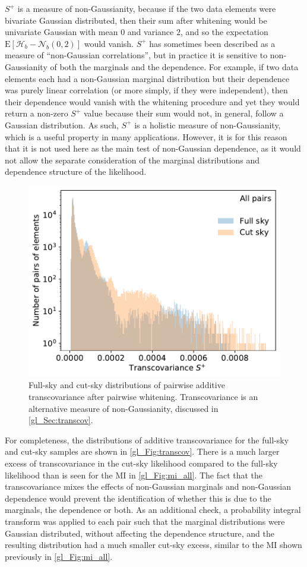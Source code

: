 $S^+$ is a measure of non-Gaussianity, because if the two data elements were bivariate Gaussian distributed, then their sum after whitening would be univariate Gaussian with mean $0$ and variance $2$, and so the expectation $\text{E} \left[ \mathcal{H}_b - \mathcal{N}_b \left(0, 2 \right) \right]$ would vanish. $S^+$ has sometimes been described as a measure of ``non-Gaussian correlations'', but in practice it is sensitive to non-Gaussianity of both the marginals and the dependence.
For example, if two data elements each had a non-Gaussian marginal distribution but their dependence was purely linear correlation (or more simply, if they were independent), then their dependence would vanish with the whitening procedure and yet they would return a non-zero $S^+$ value because their sum would not, in general, follow a Gaussian distribution. As such, $S^+$ is a holistic measure of non-Gaussianity, which is a useful property in many applications. However, it is for this reason that it is not used here as the main test of non-Gaussian dependence, as it would not allow the separate consideration of the marginal distributions and dependence structure of the likelihood.

\begin{figure}
\centering
\includegraphics[width=.5\textwidth]{transcov}
\caption{Full-sky and cut-sky distributions of pairwise additive transcovariance after pairwise whitening. Transcovariance is an alternative measure of non-Gaussianity, discussed in \autoref{gl_Sec:transcov}.}
\label{gl_Fig:transcov}
\end{figure}

For completeness, the distributions of additive transcovariance for the full-sky and cut-sky samples are shown in \autoref{gl_Fig:transcov}. There is a much larger excess of transcovariance in the cut-sky likelihood compared to the full-sky likelihood than is seen for the MI in \autoref{gl_Fig:mi_all}. The fact that the transcovariance mixes the effects of non-Gaussian marginals and non-Gaussian dependence would prevent the identification of whether this is due to the marginals, the dependence or both. As an additional check, a probability integral transform was applied to each pair such that the marginal distributions were Gaussian distributed, without affecting the dependence structure, and the resulting distribution had a much smaller cut-sky excess, similar to the MI shown previously in \autoref{gl_Fig:mi_all}.

